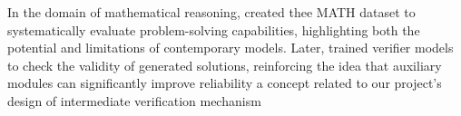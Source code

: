 In the domain of mathematical reasoning, \citet{hendrycks2021measuringmathematicalproblemsolving} created thee MATH dataset to systematically evaluate problem-solving capabilities, highlighting both the potential and limitations of contemporary models. Later, \citet{cobbe2021trainingverifierssolvemath} trained verifier models to check the validity of generated solutions, reinforcing the idea that auxiliary modules can significantly improve reliability a concept related to our project’s design of intermediate verification mechanism